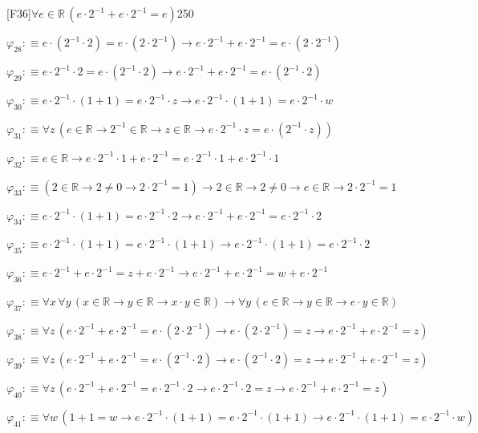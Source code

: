 \begin{fullproof}{[F36]}{$\forall e \in \mathbb{R}\,(e \cdot 2^{-1} + e \cdot 2^{-1} = e)$}{250}
\begin{abbrevlist}
\item $\varphi_{28} :\equiv e \cdot (2^{-1} \cdot 2) = e \cdot (2 \cdot 2^{-1}) \to e \cdot 2^{-1} + e \cdot 2^{-1} = e \cdot (2 \cdot 2^{-1})$
\item $\varphi_{29} :\equiv e \cdot 2^{-1} \cdot 2 = e \cdot (2^{-1} \cdot 2) \to e \cdot 2^{-1} + e \cdot 2^{-1} = e \cdot (2^{-1} \cdot 2)$
\item $\varphi_{30} :\equiv e \cdot 2^{-1} \cdot (1 + 1) = e \cdot 2^{-1} \cdot z \to e \cdot 2^{-1} \cdot (1 + 1) = e \cdot 2^{-1} \cdot w$
\item $\varphi_{31} :\equiv \forall z\,(e \in \mathbb{R} \to 2^{-1} \in \mathbb{R} \to z \in \mathbb{R} \to e \cdot 2^{-1} \cdot z = e \cdot (2^{-1} \cdot z))$
\item $\varphi_{32} :\equiv e \in \mathbb{R} \to e \cdot 2^{-1} \cdot 1 + e \cdot 2^{-1} = e \cdot 2^{-1} \cdot 1 + e \cdot 2^{-1} \cdot 1$
\item $\varphi_{33} :\equiv (2 \in \mathbb{R} \to 2 \neq 0 \to 2 \cdot 2^{-1} = 1) \to 2 \in \mathbb{R} \to 2 \neq 0 \to e \in \mathbb{R} \to 2 \cdot 2^{-1} = 1$
\item $\varphi_{34} :\equiv e \cdot 2^{-1} \cdot (1 + 1) = e \cdot 2^{-1} \cdot 2 \to e \cdot 2^{-1} + e \cdot 2^{-1} = e \cdot 2^{-1} \cdot 2$
\item $\varphi_{35} :\equiv e \cdot 2^{-1} \cdot (1 + 1) = e \cdot 2^{-1} \cdot (1 + 1) \to e \cdot 2^{-1} \cdot (1 + 1) = e \cdot 2^{-1} \cdot 2$
\item $\varphi_{36} :\equiv e \cdot 2^{-1} + e \cdot 2^{-1} = z + e \cdot 2^{-1} \to e \cdot 2^{-1} + e \cdot 2^{-1} = w + e \cdot 2^{-1}$
\item $\varphi_{37} :\equiv \forall x\,\forall y\,(x \in \mathbb{R} \to y \in \mathbb{R} \to x \cdot y \in \mathbb{R}) \to \forall y\,(e \in \mathbb{R} \to y \in \mathbb{R} \to e \cdot y \in \mathbb{R})$
\item $\varphi_{38} :\equiv \forall z\,(e \cdot 2^{-1} + e \cdot 2^{-1} = e \cdot (2 \cdot 2^{-1}) \to e \cdot (2 \cdot 2^{-1}) = z \to e \cdot 2^{-1} + e \cdot 2^{-1} = z)$
\item $\varphi_{39} :\equiv \forall z\,(e \cdot 2^{-1} + e \cdot 2^{-1} = e \cdot (2^{-1} \cdot 2) \to e \cdot (2^{-1} \cdot 2) = z \to e \cdot 2^{-1} + e \cdot 2^{-1} = z)$
\item $\varphi_{40} :\equiv \forall z\,(e \cdot 2^{-1} + e \cdot 2^{-1} = e \cdot 2^{-1} \cdot 2 \to e \cdot 2^{-1} \cdot 2 = z \to e \cdot 2^{-1} + e \cdot 2^{-1} = z)$
\item $\varphi_{41} :\equiv \forall w\,(1 + 1 = w \to e \cdot 2^{-1} \cdot (1 + 1) = e \cdot 2^{-1} \cdot (1 + 1) \to e \cdot 2^{-1} \cdot (1 + 1) = e \cdot 2^{-1} \cdot w)$

\end{abbrevlist}
\end{fullproof}
